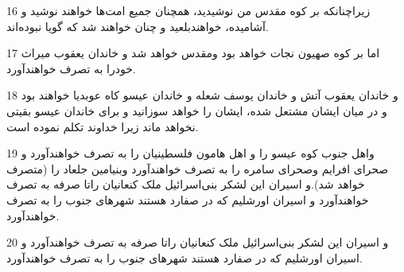 \par 16 زیراچنانکه بر کوه مقدس من نوشیدید، همچنان جمیع امت‌ها خواهند نوشید و آشامیده، خواهندبلعید و چنان خواهند شد که گویا نبوده‌اند.
\par 17 اما بر کوه صهیون نجات خواهد بود ومقدس خواهد شد و خاندان یعقوب میراث خودرا به تصرف خواهند‌آورد.
\par 18 و خاندان یعقوب آتش و خاندان یوسف شعله و خاندان عیسو کاه عوبدیا خواهند بود و در میان ایشان مشتعل شده، ایشان را خواهد سوزانید و برای خاندان عیسو بقیتی نخواهد ماند زیرا خداوند تکلم نموده است.
\par 19 واهل جنوب کوه عیسو را و اهل هامون فلسطینیان را به تصرف خواهند‌آورد و صحرای افرایم وصحرای سامره را به تصرف خواهند‌آورد وبنیامین جلعاد را (متصرف خواهد شد).و اسیران این لشکر بنی‌اسرائیل ملک کنعانیان راتا صرفه به تصرف خواهند‌آورد و اسیران اورشلیم که در صفارد هستند شهرهای جنوب را به تصرف خواهند‌آورد.
\par 20 و اسیران این لشکر بنی‌اسرائیل ملک کنعانیان راتا صرفه به تصرف خواهند‌آورد و اسیران اورشلیم که در صفارد هستند شهرهای جنوب را به تصرف خواهند‌آورد.



